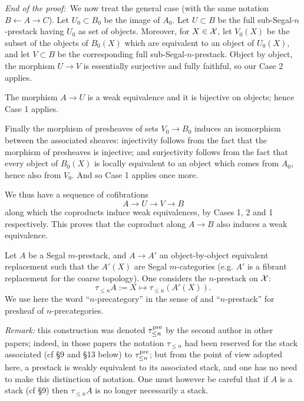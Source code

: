 \medskip

\noindent
{\em End of the proof:}\,
We now treat the general case (with the same notation
$B\leftarrow A\rightarrow C$). Let $U_0\subset B_0$ be the image of $A_0$. Let
$U\subset B$ be the full sub-Segal-$n$-prestack having $U_0$ as
set of objects. Moreover,
for $X\in {\cal X}$, let $V_0(X)$ be the subset of the objects of $B_0(X)$
which are equivalent to an object of $U_0(X)$, and let $V\subset B$ be the
corresponding full sub-Segal-$n$-prestack. Object by object, the morphism
$U\rightarrow V$ is essentially surjective and fully
faithful, so our Case 2 applies.

The morphism $A\rightarrow U$ is a weak equivalence and it is bijective
on objects; hence Case 1 applies.

Finally the morphism of presheaves of sets $V_0\rightarrow B_0$ induces an
isomorphism between the associated sheaves: injectivity follows from the
fact that the
morphism of presheaves is injective; and surjectivity follows from the
fact that
every object of $B_0(X)$ is locally equivalent to an object which comes from
$A_0$, hence also from $V_0$. And so Case 1 applies once more.

We thus have a sequence of cofibrations
$$
A\rightarrow U \rightarrow V\rightarrow B
$$
along which the coproducts induce weak equivalences, by Cases 1, 2 and 1
respectively. This proves that the
coproduct along
$A\rightarrow B$ also induces a weak equivalence.
\eop




Let $A$ be a Segal $m$-prestack, and $A\rightarrow A'$
an object-by-object equivalent replacement such that the $A'(X)$ are
Segal $m$-categories (e.g. $A'$ is a fibrant replacement for the
coarse
topology). One considers the $n$-prestack on ${\cal X}$:
$$
\tau _{\leq n} A := X\mapsto \tau _{\leq n}(A'(X)).
$$
We use here the word ``$n$-precategory'' in the sense of
\cite{nCAT} and ``$n$-prestack'' for presheaf of $n$-precategories.



{\em Remark:} this construction was denoted $\tau _{\leq n}^{\rm
pre}$ by the
second author in other papers; indeed, in those papers the notation
$\tau _{\leq n}$ had been reserved
for the stack associated (cf \S 9 and \S 13 below) to $\tau
_{\leq n}^{\rm
pre}$; but from the point of view adopted here, a prestack is weakly
equivalent to its associated stack, and one has no need to make this
distinction of notation.
One must however be careful that if $A$ is a stack (cf \S 9) then
$\tau _{\leq n}A$
is no longer necessarily a stack.




